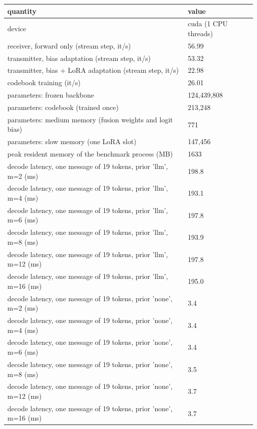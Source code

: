 \begin{tabular}{ll}
\hline
quantity & value \\
\hline
device & cuda (1 CPU threads) \\
receiver, forward only (stream step, it/s) & 56.99 \\
transmitter, bias adaptation (stream step, it/s) & 53.32 \\
transmitter, bias + LoRA adaptation (stream step, it/s) & 22.98 \\
codebook training (it/s) & 26.01 \\
parameters: frozen backbone & 124,439,808 \\
parameters: codebook (trained once) & 213,248 \\
parameters: medium memory (fusion weights and logit bias) & 771 \\
parameters: slow memory (one LoRA slot) & 147,456 \\
peak resident memory of the benchmark process (MB) & 1633 \\
decode latency, one message of 19 tokens, prior 'llm', m=2 (ms) & 198.8 \\
decode latency, one message of 19 tokens, prior 'llm', m=4 (ms) & 193.1 \\
decode latency, one message of 19 tokens, prior 'llm', m=6 (ms) & 197.8 \\
decode latency, one message of 19 tokens, prior 'llm', m=8 (ms) & 193.9 \\
decode latency, one message of 19 tokens, prior 'llm', m=12 (ms) & 197.8 \\
decode latency, one message of 19 tokens, prior 'llm', m=16 (ms) & 195.0 \\
decode latency, one message of 19 tokens, prior 'none', m=2 (ms) & 3.4 \\
decode latency, one message of 19 tokens, prior 'none', m=4 (ms) & 3.4 \\
decode latency, one message of 19 tokens, prior 'none', m=6 (ms) & 3.4 \\
decode latency, one message of 19 tokens, prior 'none', m=8 (ms) & 3.5 \\
decode latency, one message of 19 tokens, prior 'none', m=12 (ms) & 3.7 \\
decode latency, one message of 19 tokens, prior 'none', m=16 (ms) & 3.7 \\
\hline
\end{tabular}
